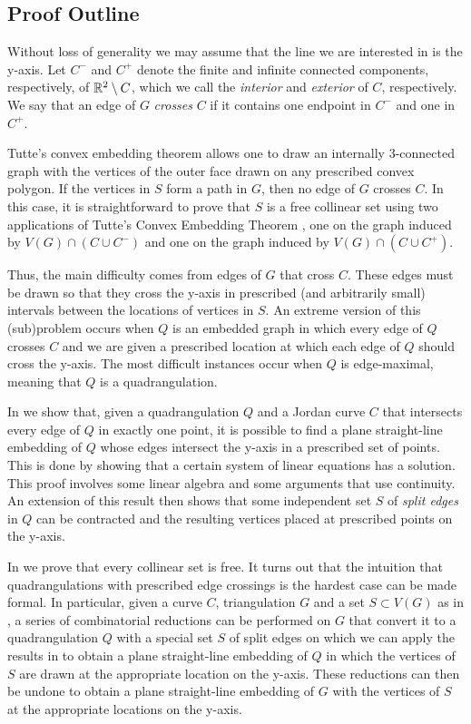 \documentclass{patmorin}
\begin{document}
\subsection{Proof Outline}

Without loss of generality we may assume that the line we are interested
in is the y-axis.  Let $C^-$ and $C^+$ denote the finite and infinite
connected components, respectively, of $\mathbb{R}^2\setminus C$, which we call
the \emph{interior} and \emph{exterior} of $C$, respectively.  We say
that an edge of $G$ \emph{crosses} $C$ if it contains one endpoint in
$C^-$ and one in $C^+$.

Tutte's convex embedding theorem \cite{tutte:how} allows one to draw an
internally 3-connected graph with the vertices of the outer face drawn
on any prescribed convex polygon.  If the vertices in $S$ form a path in
$G$, then no edge of $G$ crosses $C$. In this case, it is straightforward to
prove that $S$ is a free collinear set using two applications of Tutte's
Convex Embedding Theorem \cite{tutte:how}, one on the graph induced by
$V(G)\cap(C\cup C^-)$ and one on the graph induced by 
$V(G)\cap(C\cup C^+)$.

Thus, the main difficulty comes from edges of $G$ that cross $C$.
These edges must be drawn so that they cross the y-axis in prescribed
(and arbitrarily small) intervals between the locations of vertices
in $S$.  An extreme version of this (sub)problem occurs when $Q$ is an
embedded graph in which every edge of $Q$ crosses $C$ and we are given a
prescribed location at which each edge of $Q$ should cross the y-axis.
The most difficult instances occur when $Q$ is edge-maximal, meaning
that $Q$ is a quadrangulation.

In  we show that, given a quadrangulation $Q$
and a Jordan curve $C$ that intersects every edge of $Q$ in
exactly one point, it is possible to find a plane straight-line embedding
of $Q$ whose edges intersect the y-axis in a prescribed set of points.
This is done by showing that a certain system of linear equations has
a solution. This proof involves some linear algebra and some arguments
that use continuity.  An extension of this result then shows that some
independent set $S$ of \emph{split edges} in $Q$ can be contracted and
the resulting vertices placed at prescribed points on the y-axis.

In  we prove that every collinear set is free.
It turns out that the intuition that quadrangulations with prescribed
edge crossings is the hardest case can be made formal. In particular,
given a curve $C$, triangulation $G$ and a set $S\subset V(G)$ as
in , a series of combinatorial reductions can
be performed on $G$ that convert it to a quadrangulation $Q$ with a
special set $S$ of split edges on which we can apply the results in
 to obtain a plane straight-line embedding of
$Q$ in which the vertices of $S$ are drawn at the appropriate location
on the y-axis. These reductions can then be undone to obtain a plane
straight-line embedding of $G$ with the vertices of $S$ at the appropriate
locations on the y-axis.
\end{document}
